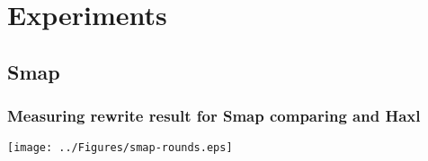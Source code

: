 \chapter{Experiments}

\label{ChapterExperiments}

\section{Smap}

\subsection{Measuring rewrite result for Smap comparing \yauhau{} and Haxl}

\texttt{[image: ../Figures/smap-rounds.eps]}
